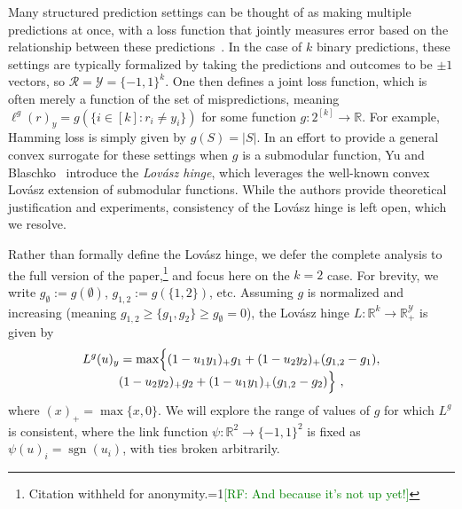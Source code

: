 \documentclass[12pt]{article}
\newcommand{\Comments}{1}
\newcommand{\mynote}[2]{\ifnum\Comments=1\textcolor{#1}{#2}\fi}
\newcommand{\mytodo}[2]{\ifnum\Comments=1%
  \todo[linecolor=#1!80!black,backgroundcolor=#1,bordercolor=#1!80!black]{#2}\fi}
\newcommand{\raf}[1]{\mynote{green}{[RF: #1]}}
\newcommand{\raft}[1]{\mytodo{green!20!white}{RF: #1}}
\newcommand{\reals}{\mathbb{R}}
\newcommand{\R}{\mathcal{R}}
\newcommand{\Y}{\mathcal{Y}}
\DeclareMathOperator*{\sgn}{sgn}
\begin{document}
Many structured prediction settings can be thought of as making multiple predictions at once, with a loss function that jointly measures error based on the relationship between these predictions~\cite{hazan2010direct, gao2011consistency, osokin2017structured}.
In the case of $k$ binary predictions, these settings are typically formalized by taking the predictions and outcomes to be $\pm 1$ vectors, so $\R=\Y=\{-1,1\}^k$.
One then defines a joint loss function, which is often merely a function of the set of mispredictions, meaning $\ell^g(r)_y = g(\{i \in [k] : r_i \neq y_i\})$ for some function $g:2^{[k]}\to\reals$.
For example, Hamming loss is simply given by $g(S) = |S|$.
In an effort to provide a general convex surrogate for these settings when $g$ is a submodular function, Yu and Blaschko~\cite{yu2018lovasz} introduce the \emph{Lov\'asz hinge}, which leverages the well-known convex Lov\'asz extension of submodular functions.
While the authors provide theoretical justification and experiments, consistency of the Lov\'asz hinge is left open, which we resolve.

Rather than formally define the Lov\'asz hinge, we defer the complete analysis to the full version of the paper,\footnote{Citation withheld for anonymity.\raf{And because it's not up yet!}} and focus here on the $k=2$ case.
For brevity, we write $g_\emptyset := g(\emptyset)$, $g_{1,2} := g(\{1,2\})$, etc.
Assuming $g$ is normalized and increasing (meaning $g_{1,2} \geq \{g_1,g_2\} \geq g_\emptyset = 0$), the Lov\'asz hinge $L:\reals^k\to\reals^\Y_+$ is given by
\begin{multline}
  \label{eq:lovasz-hinge}
  L^g(u)_y = \max\Bigl\{(1-u_1y_1)_+ g_1 + (1-u_2y_2)_+ (g_{1,2}-g_1),\\[-4pt] (1-u_2y_2)_+ g_2 + (1-u_1y_1)_+ (g_{1,2}-g_2)\Bigr\}~,
\end{multline}
where $(x)_+ = \max\{x,0\}$.
We will explore the range of values of $g$ for which $L^g$ is consistent, where the link function $\psi:\reals^2\to\{-1,1\}^2$ is fixed as $\psi(u)_i = \sgn(u_i)$, with ties broken arbitrarily.
\end{document}
